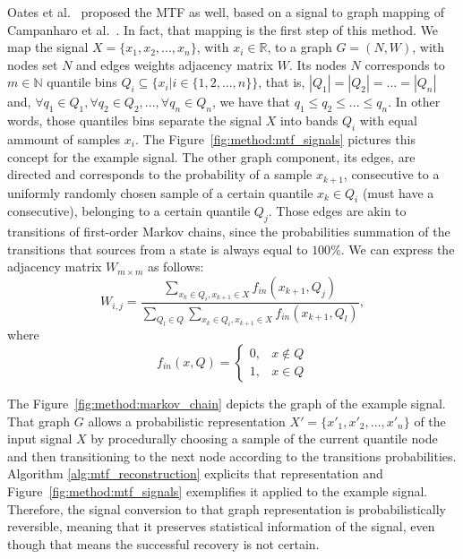 Oates et al.~\cite{gaf-mtf-1} proposed the \gls{MTF} as well, based on a signal to graph mapping of Campanharo et al.~\cite{mtf-1}. In fact, that mapping is the first step of this method. We map the signal $X=\{x_1,x_2,...,x_n\}$, with $x_i \in \mathbb{R}$, to a graph $G=(N,W)$, with nodes set $N$ and edges weights adjacency matrix $W$. Its nodes $N$ corresponds to $m \in \mathbb{N}$ quantile bins $Q_i \subseteq \{x_i | i \in \{1,2,...,n\}\}$, that is, $|Q_1|=|Q_2|=...=|Q_n|$ and, $\forall q_1 \in Q_1, \forall q_2 \in Q_2, ..., \forall q_n \in Q_n$, we have that $q_1 \leq q_2 \leq ... \leq q_n$. In other words, those quantiles bins separate the signal $X$ into bands $Q_i$ with equal ammount of samples $x_i$. The Figure~\ref{fig:method:mtf_signals} pictures this concept for the example signal. The other graph component, its edges, are directed and corresponds to the probability of a sample $x_{k+1}$, consecutive to a uniformly randomly chosen sample of a certain quantile $x_k \in Q_i$ (must have a consecutive), belonging to a certain quantile $Q_j$. Those edges are akin to transitions of first-order Markov chains, since the probabilities summation of the transitions that sources from a state is always equal to $100\%$. We can express the adjacency matrix $W_{m \times m}$ as follows:  
\begin{equation}
    W_{i,j} = \frac{
            \sum\limits_{x_k \in Q_i, x_{k+1} \in X} f_{in}(x_{k+1}, Q_j)
        }{
            \sum\limits_{Q_l \in Q}\sum\limits_{x_k \in Q_i, x_{k+1} \in X} f_{in}(x_{k+1}, Q_l) 
        },
\end{equation}
where
\begin{equation}
    f_{in}(x,Q) = \begin{cases}
        0, & x \not\in Q \\
        1, & x \in Q
    \end{cases}
\end{equation}






\noindent The Figure~\ref{fig:method:markov_chain} depicts the graph of the example signal. That graph $G$ allows a probabilistic representation $X' = \{ x'_1,x'_2,...,x'_n \}$ of the input signal $X$ by procedurally choosing a sample of the current quantile node and then transitioning to the next node according to the transitions probabilities. Algorithm \ref{alg:mtf_reconstruction} explicits that representation and Figure~\ref{fig:method:mtf_signals} exemplifies it applied to the example signal. Therefore, the signal conversion to that graph representation is probabilistically reversible, meaning that it preserves statistical information of the signal, even though that means the successful recovery is not certain.


